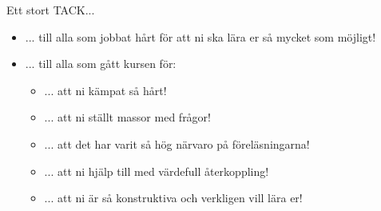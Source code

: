 \begin{Slide}{Ett stort TACK...}
\begin{itemize}
  \item
... till alla  som jobbat hårt för att ni ska lära er så mycket som möjligt!
\item ... till alla  som gått kursen för:
\begin{itemize}
\item ... att ni kämpat så hårt!
\item ... att ni ställt massor med frågor!
\item ... att det har varit så hög närvaro på föreläsningarna!
\item ... att ni hjälp till med värdefull återkoppling!
\item ... att ni är så konstruktiva och verkligen vill lära er!
\end{itemize}
\vspace{2em} \pause

\end{itemize}
\end{Slide}



\fi
